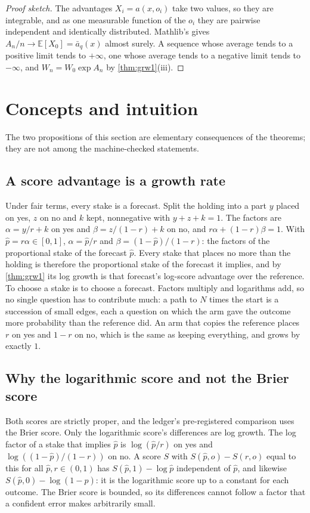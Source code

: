 \documentclass[11pt]{article}
\theoremstyle{plain}
\theoremstyle{definition}
\theoremstyle{remark}
\newcommand{\E}{\mathbb{E}}
\newcommand{\abar}{\bar a}
\begin{document}
\begin{proof}[Proof sketch]
The advantages $X_i=a(x,o_i)$ take two values, so they are integrable, and as one measurable
function of the $o_i$ they are pairwise independent and identically distributed. Mathlib's
 gives $A_n/n\to\E[X_0]=\abar_q(x)$ almost surely. A sequence whose
average tends to a positive limit tends to $+\infty$, one whose average tends to a negative limit
tends to $-\infty$, and $W_n=W_0\exp A_n$ by \cref{thm:grw1}(iii).
\end{proof}

\section{Concepts and intuition}
\label{sec:concepts}

The two propositions of this section are elementary consequences of the theorems; they are not
among the machine-checked statements.

\subsection{A score advantage is a growth rate}

Under fair terms, every stake is a forecast. Split the holding into a part $y$ placed on yes, $z$
on no and $k$ kept, nonnegative with $y+z+k=1$. The factors are $\alpha=y/r+k$ on yes and
$\beta=z/(1-r)+k$ on no, and $r\alpha+(1-r)\beta=1$. With $\hat p=r\alpha\in[0,1]$,
$\alpha=\hat p/r$ and $\beta=(1-\hat p)/(1-r)$: the factors of the proportional stake of the
forecast $\hat p$. Every stake that places no more than the holding is therefore the proportional
stake of the forecast it implies, and by \cref{thm:grw1} its log growth is that forecast's
log-score advantage over the reference. To choose a stake is to choose a forecast. Factors
multiply and logarithms add, so no single question has to contribute much: a path to $N$ times the
start is a succession of small edges, each a question on which the arm gave the outcome more
probability than the reference did. An arm that copies the reference places $r$ on yes and $1-r$ on
no, which is the same as keeping everything, and grows by exactly $1$.

\subsection{Why the logarithmic score and not the Brier score}

Both scores are strictly proper, and the ledger's pre-registered comparison uses the Brier score.
Only the logarithmic score's differences are log growth. The log factor of a stake that implies
$\hat p$ is $\log(\hat p/r)$ on yes and $\log((1-\hat p)/(1-r))$ on no. A score $S$ with
$S(\hat p,o)-S(r,o)$ equal to this for all $\hat p,r\in(0,1)$ has $S(\hat p,1)-\log\hat p$
independent of $\hat p$, and likewise $S(\hat p,0)-\log(1-\hat p)$: it is the logarithmic score up
to a constant for each outcome. The Brier score is bounded, so its differences cannot follow a
factor that a confident error makes arbitrarily small.
\end{document}
